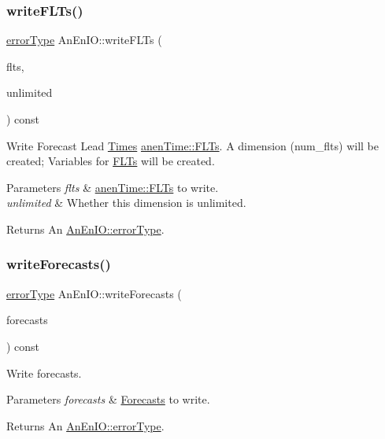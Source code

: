 \subsubsection{\texorpdfstring{write\+F\+L\+Ts()}{writeFLTs()}}
{\footnotesize\ttfamily \mbox{\hyperlink{class_an_en_i_o_aa56bc1ec6610b86db4349bce20f9ead0}{error\+Type}} An\+En\+I\+O\+::write\+F\+L\+Ts (\begin{DoxyParamCaption}\item[{const \mbox{\hyperlink{classanen_time_1_1_f_l_ts}{anen\+Time\+::\+F\+L\+Ts}} \&}]{flts,  }\item[{bool}]{unlimited }\end{DoxyParamCaption}) const}

Write Forecast Lead \mbox{\hyperlink{class_times}{Times}} \mbox{\hyperlink{classanen_time_1_1_f_l_ts}{anen\+Time\+::\+F\+L\+Ts}}. A dimension (num\+\_\+flts) will be created; Variables for \mbox{\hyperlink{class_f_l_ts}{F\+L\+Ts}} will be created. 
\begin{DoxyParams}{Parameters}
{\em flts} & \mbox{\hyperlink{classanen_time_1_1_f_l_ts}{anen\+Time\+::\+F\+L\+Ts}} to write. \\
\hline
{\em unlimited} & Whether this dimension is unlimited. \\
\hline
\end{DoxyParams}
\begin{DoxyReturn}{Returns}
An \mbox{\hyperlink{class_an_en_i_o_aa56bc1ec6610b86db4349bce20f9ead0}{An\+En\+I\+O\+::error\+Type}}. 
\end{DoxyReturn}
\mbox{\label{class_an_en_i_o_abc5b12bc4692f3ac303fa5430aecaf4c}} 
\subsubsection{\texorpdfstring{write\+Forecasts()}{writeForecasts()}}
{\footnotesize\ttfamily \mbox{\hyperlink{class_an_en_i_o_aa56bc1ec6610b86db4349bce20f9ead0}{error\+Type}} An\+En\+I\+O\+::write\+Forecasts (\begin{DoxyParamCaption}\item[{const \mbox{\hyperlink{class_forecasts}{Forecasts}} \&}]{forecasts }\end{DoxyParamCaption}) const}

Write forecasts. 
\begin{DoxyParams}{Parameters}
{\em forecasts} & \mbox{\hyperlink{class_forecasts}{Forecasts}} to write. \\
\hline
\end{DoxyParams}
\begin{DoxyReturn}{Returns}
An \mbox{\hyperlink{class_an_en_i_o_aa56bc1ec6610b86db4349bce20f9ead0}{An\+En\+I\+O\+::error\+Type}}. 
\end{DoxyReturn}
\mbox{\label{class_an_en_i_o_ae89350e02d93439e79aa76068062490a}} 
